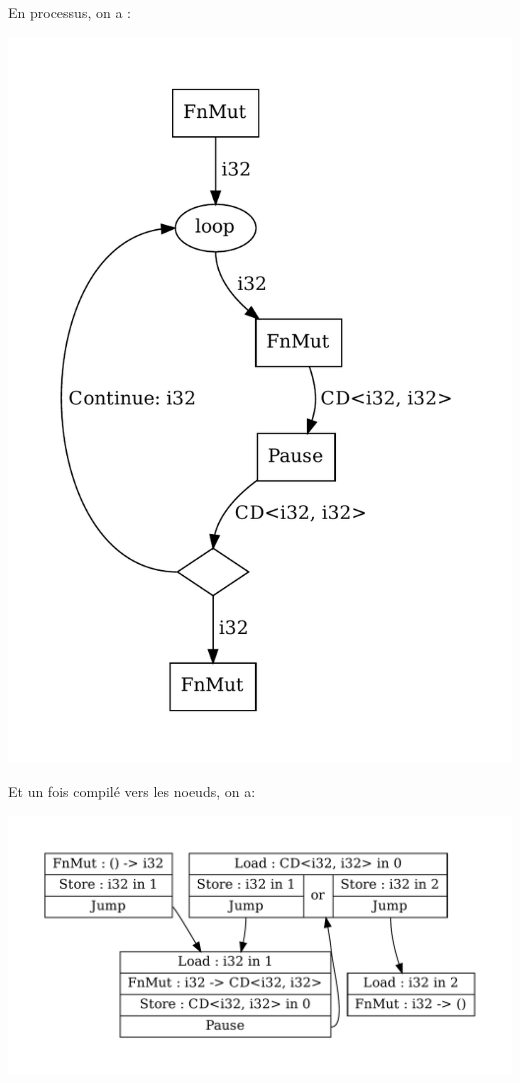\documentclass[a4paper]{article}
\renewcommand{\(}{\left(}
\renewcommand{\)}{\right)}
\begin{document}
En processus, on a :
\begin{center}
\includegraphics[scale=0.72]{loopp.pdf}
\end{center}

Et un fois compilé vers les noeuds, on a:
\begin{center}
\includegraphics[scale=0.72]{loopn.pdf}
\end{center}
\end{document}
